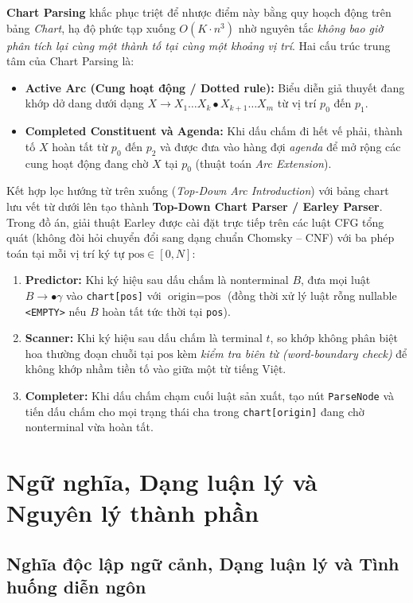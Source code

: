 \textbf{Chart Parsing} khắc phục triệt để nhược điểm này bằng quy hoạch động trên bảng \emph{Chart}, hạ độ phức tạp xuống $O(K\cdot n^3)$ nhờ nguyên tắc \emph{không bao giờ phân tích lại cùng một thành tố tại cùng một khoảng vị trí}. Hai cấu trúc trung tâm của Chart Parsing là:
\begin{itemize}
  \item \textbf{Active Arc (Cung hoạt động / Dotted rule):} Biểu diễn giả thuyết đang khớp dở dang dưới dạng $X \rightarrow X_1 \dots X_k \bullet X_{k+1} \dots X_m$ từ vị trí $p_0$ đến $p_1$.
  \item \textbf{Completed Constituent và Agenda:} Khi dấu chấm đi hết vế phải, thành tố $X$ hoàn tất từ $p_0$ đến $p_2$ và được đưa vào hàng đợi \emph{agenda} để mở rộng các cung hoạt động đang chờ $X$ tại $p_0$ (thuật toán \emph{Arc Extension}).
\end{itemize}

Kết hợp lọc hướng từ trên xuống (\emph{Top-Down Arc Introduction}) với bảng chart lưu vết từ dưới lên tạo thành \textbf{Top-Down Chart Parser / Earley Parser}. Trong đồ án, giải thuật Earley được cài đặt trực tiếp trên các luật CFG tổng quát (không đòi hỏi chuyển đổi sang dạng chuẩn Chomsky -- CNF) với ba phép toán tại mỗi vị trí ký tự $\text{pos} \in [0, N]$:
\begin{enumerate}
  \item \textbf{Predictor:} Khi ký hiệu sau dấu chấm là nonterminal $B$, đưa mọi luật $B \rightarrow \bullet \gamma$ vào \texttt{chart[pos]} với $\text{origin}=\text{pos}$ (đồng thời xử lý luật rỗng nullable \texttt{<EMPTY>} nếu $B$ hoàn tất tức thời tại \texttt{pos}).
  \item \textbf{Scanner:} Khi ký hiệu sau dấu chấm là terminal $t$, so khớp không phân biệt hoa thường đoạn chuỗi tại $\text{pos}$ kèm \emph{kiểm tra biên từ (word-boundary check)} để không khớp nhầm tiền tố vào giữa một từ tiếng Việt.
  \item \textbf{Completer:} Khi dấu chấm chạm cuối luật sản xuất, tạo nút \texttt{ParseNode} và tiến dấu chấm cho mọi trạng thái cha trong \texttt{chart[origin]} đang chờ nonterminal vừa hoàn tất.
\end{enumerate}

\section{Ngữ nghĩa, Dạng luận lý và Nguyên lý thành phần}

\subsection{Nghĩa độc lập ngữ cảnh, Dạng luận lý và Tình huống diễn ngôn}

